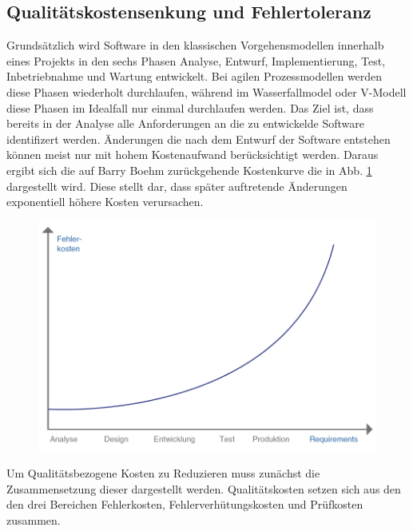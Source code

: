 \subsection{Qualitätskostensenkung und Fehlertoleranz}
Grundsätzlich wird Software in den klassischen Vorgehensmodellen innerhalb eines Projekts in den sechs Phasen Analyse, Entwurf, Implementierung, Test, Inbetriebnahme und Wartung entwickelt.
Bei agilen Prozessmodellen werden diese Phasen wiederholt durchlaufen, während im Wasserfallmodel oder V-Modell diese Phasen im Idealfall nur einmal durchlaufen werden.
Das Ziel ist, dass bereits in der Analyse alle Anforderungen an die zu entwickelde Software identifizert werden.
Änderungen die nach dem Entwurf der Software entstehen können meist nur mit hohem Kostenaufwand berücksichtigt werden.
Daraus ergibt sich die auf Barry Boehm zurückgehende Kostenkurve die in Abb. \ref{fig:boehm} dargestellt wird.
Diese stellt dar, dass später auftretende Änderungen exponentiell höhere Kosten verursachen.
\autocite[vgl.][S. 95]{witte_testmanagement_2019}
\begin{figure}[H]
    \centering
    \includegraphics[width=1\textwidth]{images/boehm.png}
    \label{fig:boehm}
\end{figure}\noindent
Um Qualitätsbezogene Kosten zu Reduzieren muss zunächst die Zusammensetzung dieser dargestellt werden.
Qualitätskosten setzen sich aus den den drei Bereichen Fehlerkosten, Fehlerverhütungskosten und Prüfkosten zusammen.
